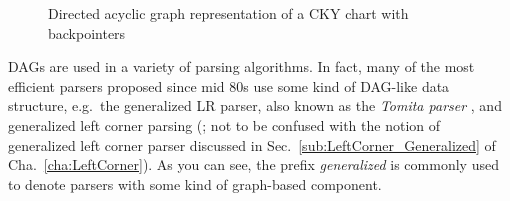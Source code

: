 \begin{figure}
    \centering
\caption{Directed acyclic graph representation of a CKY chart with backpointers}
\label{fig:Chart_DAG}
\end{figure}
%
DAGs are used in a variety of parsing algorithms.
In fact, many of the most efficient parsers proposed since mid 80s use some kind of DAG-like data structure, e.g.\ the generalized LR parser, also known as the \emph{Tomita parser} \citep{Tomita86, Tomita87}, and generalized left corner parsing (\citealp{Nederhof93}; not to be confused with the notion of generalized left corner parser discussed in Sec.~\ref{sub:LeftCorner_Generalized} of Cha.~\ref{cha:LeftCorner}).
As you can see, the prefix \emph{generalized} is commonly used to denote parsers with some kind of graph-based component.

